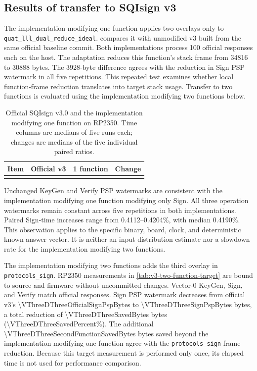\documentclass[a4paper,10pt]{article}
\theoremstyle{definition}
\theoremstyle{remark}
\begin{document}
\subsection{Results of transfer to SQIsign v3}
\label{sec:v3-results}

The implementation modifying one function applies two overlays only to \texttt{quat\_lll\_dual\_reduce\_ideal}.  compares it with unmodified v3 built from the same official baseline commit. Both implementations process 100 official responses each on the host. The adaptation reduces this function's stack frame from \num{34816} to \num{30888} bytes. The \num{3928}-byte difference agrees with the reduction in Sign PSP watermark in all five repetitions. This repeated test examines whether local function-frame reduction translates into target stack usage. Transfer to two functions is evaluated using the implementation modifying two functions below.

\begin{table}[H]
  \centering
  \caption{Official SQIsign v3.0 and the implementation modifying one function on RP2350. Time columns are medians of five runs each; changes are medians of the five individual paired ratios.}
  \label{tab:v3-results}
  \small
  \begin{tabular}{@{}lrrr@{}}
    \toprule
    Item & Official v3 & 1 function & Change \\
    \midrule
    \\
    \bottomrule
  \end{tabular}
\end{table}

Unchanged KeyGen and Verify PSP watermarks are consistent with the implementation modifying one function modifying only Sign. All three operation watermarks remain constant across five repetitions in both implementations. Paired Sign-time increases range from \num{0.4112}--\num{0.4204}\%, with median \num{0.4190}\%. This observation applies to the specific binary, board, clock, and deterministic known-answer vector. It is neither an input-distribution estimate nor a slowdown rate for the implementation modifying two functions.

The implementation modifying two functions adds the third overlay in \texttt{protocols\_sign}. RP2350 measurements in \cref{tab:v3-two-function-target} are bound to source and firmware without uncommitted changes. Vector-0 KeyGen, Sign, and Verify match official responses. Sign PSP watermark decreases from official v3's \num{\VThreeDThreeOfficialSignPspBytes} to \num{\VThreeDThreeSignPspBytes} bytes, a total reduction of \num{\VThreeDThreeSavedBytes} bytes (\num{\VThreeDThreeSavedPercent}\%). The additional \num{\VThreeDThreeSecondFunctionSavedBytes} bytes saved beyond the implementation modifying one function agree with the \texttt{protocols\_sign} frame reduction. Because this target measurement is performed only once, its elapsed time is not used for performance comparison.
\end{document}
